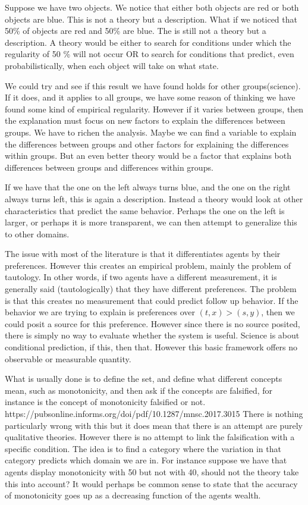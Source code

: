 \documentclass[11pt]{article}
\numberwithin{equation}{section}
\begin{document}
Suppose we have two objects. We notice that either both objects are red or both objects are blue. This is not a theory but a description. What if we noticed that 50\% of objects are red and 50\% are blue. The is still not a theory but a description. A theory would be either to search for conditions under which the regularity of 50 \% will not occur OR to search for conditions that predict, even probabilistically, when each object will take on what state. 

We could try and see if this result we have found holds for other groups(science). If it does, and it applies to all groups, we have some reason of thinking we have found some kind of empirical regularity. However if it varies between groups, then the explanation must focus on new factors to explain the differences between groups. We have to richen the analysis. Maybe we can find a variable to explain the differences between groups and other factors for explaining the differences within groups. But an even better theory would be a factor that explains both differences between groups and differences within groups.  

If we have that the one on the left always turns blue, and the one on the right always turns left, this is again a description. Instead a theory would look at other characteristics that predict the same behavior. Perhaps the one on the left is larger, or perhaps it is more transparent, we can then attempt to generalize this to other domains. 

The issue with most of the literature is that it differentiates agents by their preferences. However this creates an empirical problem, mainly the problem of tautology. In other words, if two agents have a different measurement, it is generally said (tautologically) that they have different preferences. The problem is that this creates no measurement that could predict follow up behavior. If the behavior we are trying to explain is preferences over $(t,x)>(s,y)$, then we could posit a source for this preference. However since there is no source posited, there is simply no way to evaluate whether the system is useful. Science is about conditional prediction, if this, then that. However this basic framework offers no observable or measurable quantity. 

What is usually done is to define the set, and define what different concepts mean, such as monotonicity, and then ask if the concepts are falsified, for instance is the concept of monotonicity falsified or not. https://pubsonline.informs.org/doi/pdf/10.1287/mnsc.2017.3015
There is nothing particularly wrong with this but it does mean that there is an attempt are purely qualitative theories. However there is no attempt to link the falsification with a specific condition. The idea is to find a category where the variation in that category predicts which domain we are in. For instance suppose we have that agents display monotonicity with 50 but not with 40, should not the theory take this into account? It would perhaps be common sense to state that the accuracy of monotonicity goes up as a decreasing function of the agents wealth. 
\end{document}

